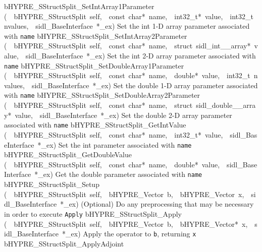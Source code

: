 \documentclass{article}
\begin{document}
\begin{cxxentry}
\begin{cxxentry}
\begin{cxxnames}
        {bHYPRE\_SStructSplit\_SetIntArray1Parameter}
        {(\ \ bHYPRE\_SStructSplit\ self,\ \ const\ char*\ name,\ \ int32\_t*\ value,\ \ int32\_t\ nvalues,\ \ sidl\_BaseInterface\ *\_ex)}
        {
Set the int 1-D array parameter associated with {\tt name}}
        {}
\label{cxx.8.2.20}
        {bHYPRE\_SStructSplit\_SetIntArray2Parameter}
        {(\ \ bHYPRE\_SStructSplit\ self,\ \ const\ char*\ name,\ \ struct\ sidl\_int\_\_array*\ value,\ \ sidl\_BaseInterface\ *\_ex)}
        {
Set the int 2-D array parameter associated with {\tt name}}
        {}
\label{cxx.8.2.21}
        {bHYPRE\_SStructSplit\_SetDoubleArray1Parameter}
        {(\ \ bHYPRE\_SStructSplit\ self,\ \ const\ char*\ name,\ \ double*\ value,\ \ int32\_t\ nvalues,\ \ sidl\_BaseInterface\ *\_ex)}
        {
Set the double 1-D array parameter associated with {\tt name}}
        {}
\label{cxx.8.2.22}
        {bHYPRE\_SStructSplit\_SetDoubleArray2Parameter}
        {(\ \ bHYPRE\_SStructSplit\ self,\ \ const\ char*\ name,\ \ struct\ sidl\_double\_\_array*\ value,\ \ sidl\_BaseInterface\ *\_ex)}
        {
Set the double 2-D array parameter associated with {\tt name}}
        {}
\label{cxx.8.2.23}
        {bHYPRE\_SStructSplit\_GetIntValue}
        {(\ \ bHYPRE\_SStructSplit\ self,\ \ const\ char*\ name,\ \ int32\_t*\ value,\ \ sidl\_BaseInterface\ *\_ex)}
        {
Set the int parameter associated with {\tt name}}
        {}
\label{cxx.8.2.24}
        {bHYPRE\_SStructSplit\_GetDoubleValue}
        {(\ \ bHYPRE\_SStructSplit\ self,\ \ const\ char*\ name,\ \ double*\ value,\ \ sidl\_BaseInterface\ *\_ex)}
        {
Get the double parameter associated with {\tt name}}
        {}
\label{cxx.8.2.25}
        {bHYPRE\_SStructSplit\_Setup}
        {(\ \ bHYPRE\_SStructSplit\ self,\ \ bHYPRE\_Vector\ b,\ \ bHYPRE\_Vector\ x,\ \ sidl\_BaseInterface\ *\_ex)}
        {
(Optional) Do any preprocessing that may be necessary in
order to execute {\tt Apply}}
        {}
\label{cxx.8.2.26}
        {bHYPRE\_SStructSplit\_Apply}
        {(\ \ bHYPRE\_SStructSplit\ self,\ \ bHYPRE\_Vector\ b,\ \ bHYPRE\_Vector*\ x,\ \ sidl\_BaseInterface\ *\_ex)}
        {
Apply the operator to {\tt b}, returning {\tt x}}
        {}
\label{cxx.8.2.27}
        {bHYPRE\_SStructSplit\_ApplyAdjoint}

\end{cxxnames}
\end{cxxentry}
\end{cxxentry}
\end{document}
